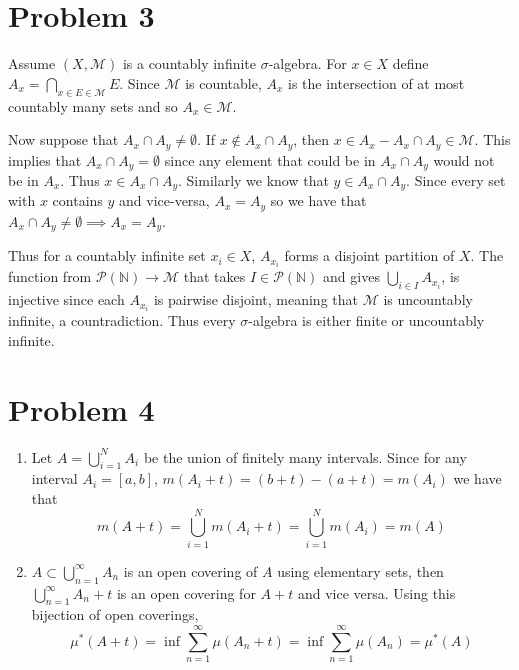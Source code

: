 \documentclass{article}
\begin{document}
\section*{Problem 3}
Assume $(X, \mathcal{M})$ is a countably infinite $\sigma$-algebra.
For $x \in X$ define $A_x = \bigcap_{x\in E\in \mathcal{M}} E$.
Since $\mathcal{M}$ is countable, $A_x$ is the intersection of at most 
countably many sets and so $A_x \in \mathcal{M}$.

Now suppose that $A_x \cap A_y \neq \emptyset$.
If $x \not\in A_x \cap A_y$, then 
$x \in A_x - A_x \cap A_y \in \mathcal{M}$.
This implies that $A_x \cap A_y = \emptyset$ since 
any element that could be in $A_x \cap A_y$ would not be in $A_x$.
Thus $x \in A_x \cap A_y$.
Similarly we know that $y \in A_x \cap A_y$.
Since every set with $x$ contains $y$ and vice-versa, $A_x = A_y$
so we have that $A_x \cap A_y \neq \emptyset \implies A_x = A_y$.

Thus for a countably infinite set $x_i\in X$, $A_{x_i}$ forms
a disjoint partition of $X$.
The function from $\mathcal{P}(\mathbb{N}) \to \mathcal{M}$
that takes $I \in \mathcal{P}(\mathbb{N})$
and gives $\bigcup_{i \in I} A_{x_i}$,
is injective since each $A_{x_i}$ is pairwise disjoint,
meaning that $\mathcal{M}$ is uncountably infinite, a countradiction.
Thus every $\sigma$-algebra is either finite or uncountably infinite.
\newpage 

\section*{Problem 4}
\begin{enumerate}
  \item Let $A = \bigcup_{i=1}^N A_i$ be the union of finitely many intervals. 
  Since for any interval $A_i = [a,b]$,
  $m(A_i+t) = (b+t) - (a+t) = m(A_i)$
  we have that
  \[
    m(A+t) 
    = \bigcup_{i=1}^N m(A_i+t) 
    = \bigcup_{i=1}^N m(A_i) 
    = m(A)
  \]
  \item $A \subset \bigcup_{n=1}^\infty A_n$
  is an open covering of $A$ using elementary sets, 
  then $\bigcup_{n=1}^\infty A_n +t$
  is an open covering for $A+t$ and vice versa.
  Using this bijection of open coverings,
  \[
    \mu^*(A+t) = \inf \sum_{n=1}^\infty \mu(A_n + t) 
    = \inf \sum_{n=1}^\infty \mu(A_n) 
    = \mu^*(A)
  \]

\end{enumerate}
\newpage
\end{document}
